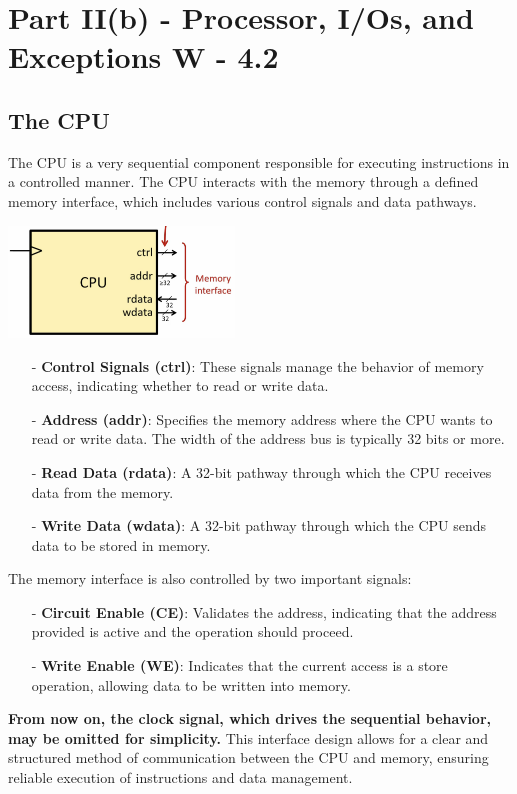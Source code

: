 \chapter{Part II(b) - Processor, I/Os, and Exceptions W - 4.2}
\section{The CPU}

The CPU is a very sequential component responsible for executing instructions in a controlled manner. The CPU interacts with the memory through a defined memory interface, which includes various control signals and data pathways.
\begin{center}
    \includegraphics[width=0.45\textwidth]{chapters/chapter2b/images/cpu.png}
\end{center}
\begin{itemize}
    \item[-] \textbf{Control Signals (ctrl)}: These signals manage the behavior of memory access, indicating whether to read or write data.
    \item[-] \textbf{Address (addr)}: Specifies the memory address where the CPU wants to read or write data. The width of the address bus is typically 32 bits or more.
    \item[-] \textbf{Read Data (rdata)}: A 32-bit pathway through which the CPU receives data from the memory.
    \item[-] \textbf{Write Data (wdata)}: A 32-bit pathway through which the CPU sends data to be stored in memory.
\end{itemize}

The memory interface is also controlled by two important signals:
\begin{itemize}
    \item[-] \textbf{Circuit Enable (CE)}: Validates the address, indicating that the address provided is active and the operation should proceed.
    \item[-] \textbf{Write Enable (WE)}: Indicates that the current access is a store operation, allowing data to be written into memory.
\end{itemize}
\textbf{From now on, the clock signal, which drives the sequential behavior, may be omitted for simplicity.}
This interface design allows for a clear and structured method of communication between the CPU and memory, ensuring reliable execution of instructions and data management.



